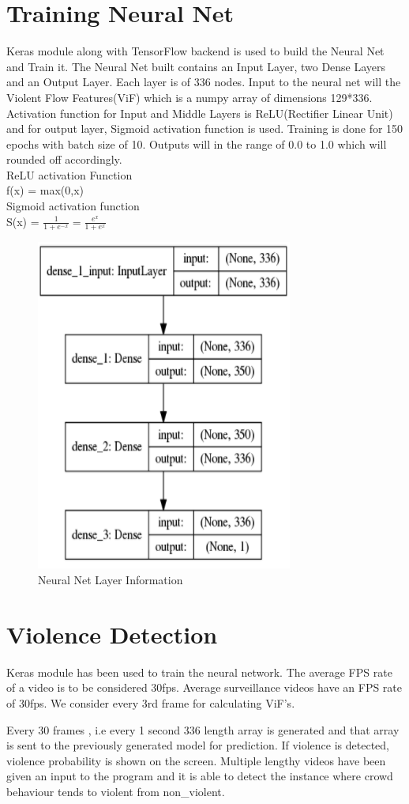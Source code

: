 \section{Training Neural Net}
Keras module along with TensorFlow backend is used to build the Neural Net and Train it. The Neural Net built contains an Input Layer, two Dense Layers and an Output Layer. Each layer is of 336 nodes. Input to the neural net will the Violent Flow Features(ViF) which is a numpy array of dimensions 129*336. Activation function for Input and Middle Layers is ReLU(Rectifier Linear Unit) and for output layer, Sigmoid activation function is used. Training is done for 150 epochs with batch size of 10. Outputs will in the range of 0.0 to 1.0 which will rounded off accordingly. \\
ReLU activation Function \\
f(x) = max(0,x)\\
Sigmoid activation function \\
S(x) = $\frac{1}{1+e^{-x}} = \frac{e^x}{1+e^x}$
\begin{center}
\begin{figure}[H]
\centering
\includegraphics[scale = 0.6]{neural_net.png}
\caption{Neural Net Layer Information}
\end{figure}
\end{center}
\section{Violence Detection}
Keras module has been used to train the neural network. The average FPS rate of a video is to be considered 30fps. Average surveillance videos have an FPS rate of 30fps. We consider every 3rd frame for calculating ViF’s. 
\par
	Every 30 frames , i.e every 1 second 336 length array is generated and that array is sent to the previously generated model for prediction. If violence is detected, violence probability is shown on the screen. Multiple lengthy videos have been given an input to the program and it is able to detect the instance where crowd behaviour tends to violent from non\_violent.


